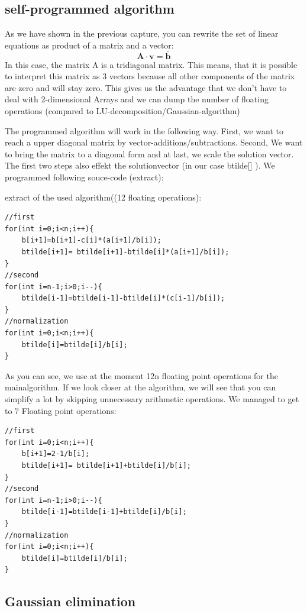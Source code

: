 \documentclass[10pt,a4paper]{article}
\begin{document}
\subsection{self-programmed algorithm }

As we have shown in the previous capture, you can rewrite the set of linear equations as product of a matrix and a vector:
\begin{equation}
	\mathbf{A \cdot v}=\bar{\mathbf{b}}
\end{equation}
In this case, the matrix A is a tridiagonal matrix. This means, that it is possible to interpret this matrix as 3 vectors because all other components of the matrix are zero and will stay zero. This gives us the advantage that we don't have to deal with 2-dimensional Arrays and we can dump the number of floating operations (compared to LU-decomposition/Gaussian-algorithm)

The programmed algorithm will work in the following way. First, we want to reach a upper diagonal matrix by vector-additions/subtractions. Second, We want to bring the matrix to a diagonal form and at last, we scale the solution vector. The first two steps also effekt the solutionvector (in our case btilde[] ). We programmed following souce-code (extract):

extract of the used algorithm((12 floating operations):
\begin{lstlisting}
//first
for(int i=0;i<n;i++){
	b[i+1]=b[i+1]-c[i]*(a[i+1]/b[i]);
	btilde[i+1]= btilde[i+1]-btilde[i]*(a[i+1]/b[i]);
}
//second
for(int i=n-1;i>0;i--){
	btilde[i-1]=btilde[i-1]-btilde[i]*(c[i-1]/b[i]);
}
//normalization
for(int i=0;i<n;i++){
	btilde[i]=btilde[i]/b[i];
}
\end{lstlisting}
	
	
As you can see, we use at the moment 12n floating point operations for the mainalgorithm. If we look closer at the algorithm, we will see that you can simplify a lot by skipping unnecessary arithmetic operations. 
We managed to get to 7 Floating point operations:
\begin{lstlisting}
//first
for(int i=0;i<n;i++){
	b[i+1]=2-1/b[i];
	btilde[i+1]= btilde[i+1]+btilde[i]/b[i];
}
//second
for(int i=n-1;i>0;i--){
	btilde[i-1]=btilde[i-1]+btilde[i]/b[i];
}
//normalization
for(int i=0;i<n;i++){
	btilde[i]=btilde[i]/b[i];
}
\end{lstlisting}
	
\subsection{Gaussian elimination}
\end{document}
